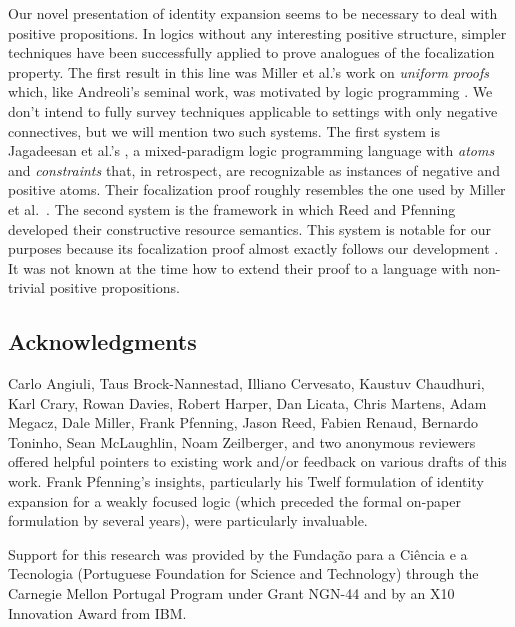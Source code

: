 \documentclass[acmtocl]{robtrans}\pdfoutput=1
\begin{document}
Our novel presentation of identity expansion seems to be necessary to
deal with positive propositions. In logics without any interesting
positive structure, simpler techniques have been successfully applied
to prove analogues of the focalization property. The first result in
this line was Miller et al.'s work on {\it uniform proofs} which, like
Andreoli's seminal work, was motivated by logic programming
\cite{miller91uniform}.  We don't intend to fully survey techniques
applicable to settings with only negative connectives, but we will
mention two such systems.  The first system is Jagadeesan et al.'s
, a mixed-paradigm logic programming language with {\it
  atoms} and {\it constraints} that, in retrospect, 
are recognizable as instances of 
negative and positive atoms.
Their focalization proof roughly
resembles the one used by Miller et
al.~\cite{jagadeesan05testing}. The second system is the framework in
which Reed and Pfenning developed their constructive resource
semantics. This system is notable for our purposes because its
focalization proof almost exactly follows our development
\cite{reed10focus}. It was not known at the time how to extend their
proof to a language with non-trivial positive propositions.

\subsection*{Acknowledgments}

Carlo Angiuli, Taus Brock-Nannestad, Illiano Cervesato, 
Kaustuv Chaudhuri, Karl Crary,
Rowan Davies,
Robert Harper, Dan Licata, Chris Martens, Adam Megacz, Dale Miller,
Frank Pfenning, Jason Reed, Fabien Renaud, Bernardo Toninho, 
Sean McLaughlin, Noam Zeilberger, and
two anonymous reviewers offered helpful pointers to existing work
and/or feedback on various drafts of this work.  Frank Pfenning's
insights, particularly his Twelf formulation of identity expansion for
a weakly focused logic (which preceded the formal on-paper formulation
by several years), were particularly invaluable.

Support for this research was provided by the Funda\c{c}\~ao para a
Ci\^encia e a Tecnologia (Portuguese Foundation for Science and
Technology) through the Carnegie Mellon Portugal Program under Grant
NGN-44 and by an X10 Innovation Award from IBM.



\end{document}

